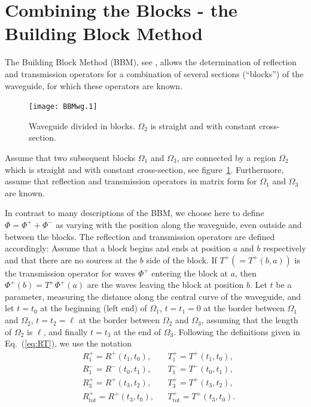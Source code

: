 \documentclass[numreferences]{kluwer}
\renewcommand{\Phi}{\varPhi}
\renewcommand{\vec}[1]{\bm{#1}}
\renewcommand{\Phi}{\varPhi}
\newcommand{\Ttot}{T^+_{\text{tot}}}
\newcommand{\Rtot}{R^+_{\text{tot}}}
\begin{document}
\section{Combining the Blocks - the Building Block Method}
\label{sec:comb-blocks-build}

The Building Block Method (BBM), see \cite{nilssonbrander1981b},
allows the determination of reflection and transmission operators for
a combination of several sections (``blocks'') of the waveguide, for
which these operators are known.  

\begin{figure}[htb]
  \centering
  \texttt{[image: BBMwg.1]}
  \caption{Waveguide divided in blocks. $\Omega_2$ is straight and
    with constant cross-section.}
  \label{fig:wg4}
\end{figure}


Assume that two subsequent blocks $\Omega_1$ and $\Omega_3$, are
connected by a region $\Omega_2$ which is straight and with constant
cross-section, see figure~\ref{fig:wg4}.  Furthermore, assume that
reflection and transmission operators in matrix form for $\Omega_1$
and $\Omega_3$ are known.

In contrast to many descriptions of the BBM, we choose here to define
$\vec\Phi=\vec\Phi^++\vec\Phi^-$ as varying with the position along
the waveguide, even outside and between the blocks. The reflection and
transmission operators are defined accordingly: Assume that a block
begins and ends at position $a$ and $b$ respectively and that
there are no sources at the $b$ side of the block. If $T^+(=T^+(b,a))$
is the transmission operator for waves $\vec\Phi^+$ entering the block
at $a$, then $\vec\Phi^+(b)=T^+\vec\Phi^+(a)$ are the waves leaving
the block at position $b$. Let $t$ be a parameter, measuring the
distance along the central curve of the waveguide, and let $t=t_0$ at
the beginning (left end) of $\Omega_1$, $t=t_1=0$ at the border between
$\Omega_1$ and $\Omega_2$, $t=t_2=\ell$ at the border between $\Omega_2$
and $\Omega_3$, assuming that the length of $\Omega_2$ is $\ell$, 
 and finally $t=t_3$ at the end of
$\Omega_3$. Following the definitions given in Eq.~(\ref{eq:RT}), we
use the notation
\begin{align*}
  &R^+_1=R^+(t_1,t_0),&&T^+_1=T^+(t_1,t_0),\\
  &R^-_1=R^-(t_0,t_1),&&T^-_1=T^-(t_0,t_1),\\
  &R^+_3=R^+(t_3,t_2),&&T^+_3=T^+(t_3,t_2),\\
  &\Rtot=R^+(t_3,t_0),&&\Ttot=T^+(t_3,t_0).
\end{align*}
\end{document}

